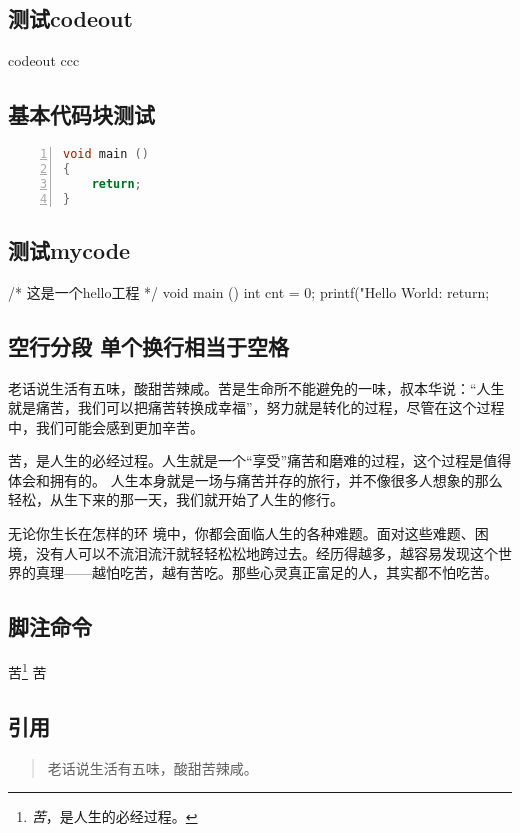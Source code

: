 \subsection{测试codeout}
\begin{codeout}
codeout ccc
\end{codeout}


\subsection{基本代码块测试}
\begin{lstlisting}[language=C, numbers=left]
void main ()
{
    return;
}
\end{lstlisting}

\subsection{测试mycode}
\begin{myccode}[caption={hello工程}]
/* 这是一个hello工程 */
void main ()
{
    int cnt = 0;
    printf("Hello World: %
    return;
}
\end{myccode}

\subsection{空行分段 单个换行相当于空格}
老话说生活有五味，酸甜苦辣咸。苦是生命所不能避免的一味，叔本华说：“人生就是痛苦，我们可以把痛苦转换成幸福”，努力就是转化的过程，尽管在这个过程中，我们可能会感到更加辛苦。

苦，是人生的必经过程。人生就是一个“享受”痛苦和磨难的过程，这个过程是值得体会和拥有的。
人生本身就是一场与痛苦并存的旅行，并不像很多人想象的那么轻松，从生下来的那一天，我们就开始了人生的修行。

无论你生长在怎样的环
境中，你都会面临人生的各种难题。面对这些难题、困境，没有人可以不流泪流汗就轻轻松松地跨过去。经历得越多，越容易发现这个世界的真理——越怕吃苦，越有苦吃。那些心灵真正富足的人，其实都不怕吃苦。

\subsection{脚注命令}
苦\footnote{\emph 苦，是人生的必经过程。}
苦

\subsection{引用}
\begin{quote}
老话说生活有五味，酸甜苦辣咸。
\end{quote}

